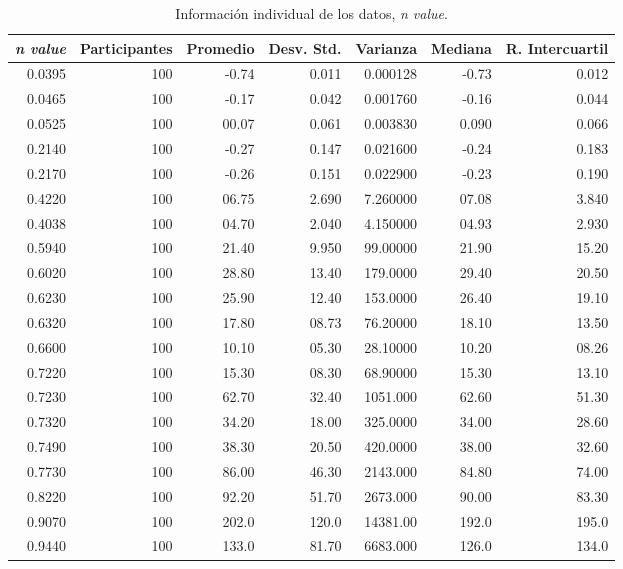 \documentclass{elsarticle}
\begin{document}
\begin{table}[htb]
    \centering
    \caption{Informaci\'on individual de los datos, \textit{n value}.} 
    \begin{tabular}{|r|r|r|r|r|r|r|}
    \hline
    \textit{n value} & Participantes & Promedio & Desv. Std. & Varianza & Mediana & R. Intercuartil  \\
    \hline
    0.0395 & 100 & -0.74 & 0.011 & 0.000128 & -0.73 & 0.012 \\
    \hline
    0.0465 & 100 & -0.17 & 0.042 & 0.001760 & -0.16 & 0.044 \\
    \hline
    0.0525 & 100 & 00.07 & 0.061 & 0.003830 & 0.090 & 0.066 \\
    \hline
    0.2140 & 100 & -0.27 & 0.147 & 0.021600 & -0.24 & 0.183 \\
    \hline
    0.2170 & 100 & -0.26 & 0.151 & 0.022900 & -0.23 & 0.190 \\
    \hline
    0.4220 & 100 & 06.75 & 2.690 & 7.260000 & 07.08 & 3.840 \\
    \hline
    0.4038 & 100 & 04.70 & 2.040 & 4.150000 & 04.93 & 2.930 \\
    \hline
    0.5940 & 100 & 21.40 & 9.950 & 99.00000 & 21.90 & 15.20 \\
    \hline
    0.6020 & 100 & 28.80 & 13.40 & 179.0000 & 29.40 & 20.50 \\
    \hline
    0.6230 & 100 & 25.90 & 12.40 & 153.0000 & 26.40 & 19.10 \\
    \hline
    0.6320 & 100 & 17.80 & 08.73 & 76.20000 & 18.10 & 13.50 \\
    \hline
    0.6600 & 100 & 10.10 & 05.30 & 28.10000 & 10.20 & 08.26 \\
    \hline
    0.7220 & 100 & 15.30 & 08.30 & 68.90000 & 15.30 & 13.10 \\
    \hline
    0.7230 & 100 & 62.70 & 32.40 & 1051.000 & 62.60 & 51.30 \\
    \hline
    0.7320 & 100 & 34.20 & 18.00 & 325.0000 & 34.00 & 28.60 \\
    \hline
    0.7490 & 100 & 38.30 & 20.50 & 420.0000 & 38.00 & 32.60 \\
    \hline
    0.7730 & 100 & 86.00 & 46.30 & 2143.000 & 84.80 & 74.00 \\
    \hline
    0.8220 & 100 & 92.20 & 51.70 & 2673.000 & 90.00 & 83.30 \\
    \hline
    0.9070 & 100 & 202.0 & 120.0 & 14381.00 & 192.0 & 195.0 \\
    \hline
    0.9440 & 100 & 133.0 & 81.70 & 6683.000 & 126.0 & 134.0 \\
    \hline
\end{tabular}
    \label{cuadro 7}
\end{table}
\end{document}
